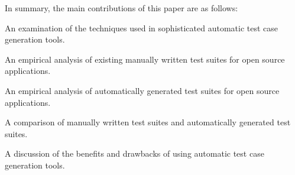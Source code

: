 In summary, the main contributions of this paper are as follows:
\squishlist 
\item An examination of the techniques used in sophisticated automatic test case generation tools.
\item An empirical analysis of existing manually written test suites for open source applications.
\item An empirical analysis of automatically generated test suites for open source applications.
\item A comparison of manually written test suites and automatically generated test suites.
\item A discussion of the benefits and drawbacks of using automatic test case generation tools.
\squishend 

